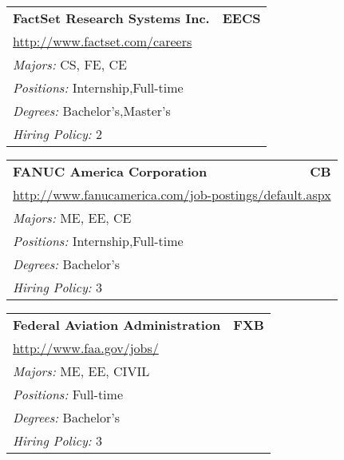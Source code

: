 \documentclass[twoside]{article}
\begin{document}
\begin{center}
\begin{multicols}{3}
\begin{FlushLeft}
\begin{minipage}{.9\columnwidth}
\end{minipage}
 
\begin{minipage}{.9\columnwidth}\begin{tabularx}{.95\columnwidth}{Xr}
                 {\Large\bf FactSet Research Systems Inc.} & {\Large\bf EECS}\\
    \multicolumn{2}{p{.95\columnwidth}}{\url{http://www.factset.com/careers}}\\
    \multicolumn{2}{p{.95\columnwidth}}{\emph{Majors:} CS, FE, CE}\\
    \multicolumn{2}{p{.95\columnwidth}}{\emph{Positions:} Internship,Full-time}\\
    \multicolumn{2}{p{.95\columnwidth}}{\emph{Degrees:} Bachelor's,Master's}\\
    \multicolumn{2}{p{.95\columnwidth}}{\emph{Hiring Policy:} 2}\\
    \end{tabularx}
    
\end{minipage}
 
\begin{minipage}{.9\columnwidth}\begin{tabularx}{.95\columnwidth}{Xr}
                 {\Large\bf FANUC America Corporation} & {\Large\bf CB}\\
    \multicolumn{2}{p{.95\columnwidth}}{\url{http://www.fanucamerica.com/job-postings/default.aspx}}\\
    \multicolumn{2}{p{.95\columnwidth}}{\emph{Majors:} ME, EE, CE}\\
    \multicolumn{2}{p{.95\columnwidth}}{\emph{Positions:} Internship,Full-time}\\
    \multicolumn{2}{p{.95\columnwidth}}{\emph{Degrees:} Bachelor's}\\
    \multicolumn{2}{p{.95\columnwidth}}{\emph{Hiring Policy:} 3}\\
    \end{tabularx}
    
\end{minipage}
 
\begin{minipage}{.9\columnwidth}\begin{tabularx}{.95\columnwidth}{Xr}
                 {\Large\bf Federal Aviation Administration} & {\Large\bf FXB}\\
    \multicolumn{2}{p{.95\columnwidth}}{\url{http://www.faa.gov/jobs/}}\\
    \multicolumn{2}{p{.95\columnwidth}}{\emph{Majors:} ME, EE, CIVIL}\\
    \multicolumn{2}{p{.95\columnwidth}}{\emph{Positions:} Full-time}\\
    \multicolumn{2}{p{.95\columnwidth}}{\emph{Degrees:} Bachelor's}\\
    \multicolumn{2}{p{.95\columnwidth}}{\emph{Hiring Policy:} 3}\\
    \end{tabularx}
    

\end{minipage}
\end{FlushLeft}
\end{multicols}
\end{center}
\end{document}
